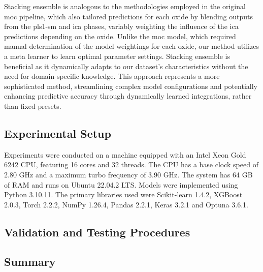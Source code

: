 Stacking ensemble is analogous to the methodologies employed in the original \gls{moc} pipeline, which also tailored predictions for each oxide by blending outputs from the \gls{pls1-sm} and \gls{ica} phases, variably weighting the influence of the \gls{ica} predictions depending on the oxide.
Unlike the \gls{moc} model, which required manual determination of the model weightings for each oxide, our method utilizes a meta learner to learn optimal parameter settings.
Stacking ensemble is beneficial as it dynamically adapts to our dataset's characteristics without the need for domain-specific knowledge.
This approach represents a more sophisticated method, streamlining complex model configurations and potentially enhancing predictive accuracy through dynamically learned integrations, rather than fixed presets.


\subsection{Experimental Setup}
Experiments were conducted on a machine equipped with an Intel Xeon Gold 6242 CPU, featuring 16 cores and 32 threads.
The CPU has a base clock speed of 2.80 GHz and a maximum turbo frequency of 3.90 GHz.
The system has 64 GB of RAM and runs on Ubuntu 22.04.2 LTS.
Models were implemented using Python 3.10.11.
The primary libraries used were Scikit-learn 1.4.2, XGBoost 2.0.3, Torch 2.2.2, NumPy 1.26.4, Pandas 2.2.1, Keras 3.2.1 and Optuna 3.6.1.

\subsection{Validation and Testing Procedures}


\subsection{Summary}
